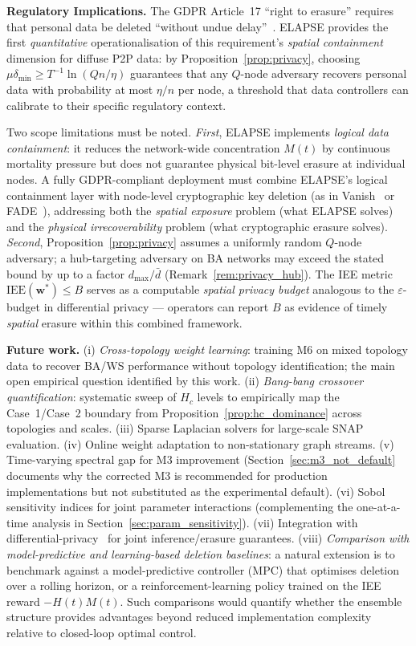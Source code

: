 \documentclass[review,12pt]{elsarticle}
\newcommand{\bfw}{\mathbf{w}}
\newcommand{\IEE}{\mathrm{IEE}}
\newcommand{\Hc}{H_c}
\begin{document}
\textbf{Regulatory Implications.}
The GDPR Article~17 ``right to erasure'' requires that personal data be
deleted ``without undue delay''~\cite{gdpr2016}.  ELAPSE provides
the first \emph{quantitative} operationalisation of this requirement's
\emph{spatial containment} dimension for diffuse P2P data: by
Proposition~\ref{prop:privacy}, choosing
$\mu\delta_{\min} \geq T^{-1}\ln(Qn/\eta)$ guarantees that any
$Q$-node adversary recovers personal data with probability at most
$\eta/n$ per node, a threshold that data controllers can calibrate to
their specific regulatory context.

Two scope limitations must be noted.  \emph{First}, ELAPSE implements
\emph{logical data containment}: it reduces the network-wide concentration
$M(t)$ by continuous mortality pressure but does not guarantee
physical bit-level erasure at individual nodes.  A fully GDPR-compliant
deployment must combine ELAPSE's logical containment layer with
node-level cryptographic key deletion (as in Vanish~\cite{geambasu2009vanish}
or FADE~\cite{tang2010fade}), addressing both the \emph{spatial exposure}
problem (what ELAPSE solves) and the \emph{physical irrecoverability}
problem (what cryptographic erasure solves).
\emph{Second}, Proposition~\ref{prop:privacy} assumes a uniformly random
$Q$-node adversary; a hub-targeting adversary on BA networks may exceed
the stated bound by up to a factor $d_{\max}/\bar{d}$
(Remark~\ref{rem:privacy_hub}).
The IEE metric $\IEE(\bfw^*) \leq B$ serves as a computable \emph{spatial
privacy budget} analogous to the $\varepsilon$-budget in differential
privacy --- operators can report $B$ as evidence of timely \emph{spatial}
erasure within this combined framework.

\textbf{Future work.}
(i) \emph{Cross-topology weight learning}: training M6 on mixed
topology data to recover BA/WS performance without topology identification;
the main open empirical question identified by this work.
(ii) \emph{Bang-bang crossover quantification}: systematic sweep of $\Hc$
levels to empirically map the Case~1/Case~2 boundary from
Proposition~\ref{prop:hc_dominance} across topologies and scales.
(iii) Sparse Laplacian solvers for large-scale SNAP evaluation.
(iv) Online weight adaptation to non-stationary graph streams.
(v) Time-varying spectral gap for M3 improvement (Section~\ref{sec:m3_not_default}
documents why the corrected M3 is recommended for production implementations
but not substituted as the experimental default).
(vi) Sobol sensitivity indices for joint parameter interactions
(complementing the one-at-a-time analysis in Section~\ref{sec:param_sensitivity}).
(vii) Integration with differential-privacy~\cite{dwork2014algorithmic}
for joint inference/erasure guarantees.
(viii) \emph{Comparison with model-predictive and learning-based deletion
baselines}: a natural extension is to benchmark against a model-predictive
controller (MPC) that optimises deletion over a rolling horizon, or a
reinforcement-learning policy trained on the IEE reward $-H(t)M(t)$.
Such comparisons would quantify whether the ensemble structure provides
advantages beyond reduced implementation complexity relative to
closed-loop optimal control.
\end{document}
